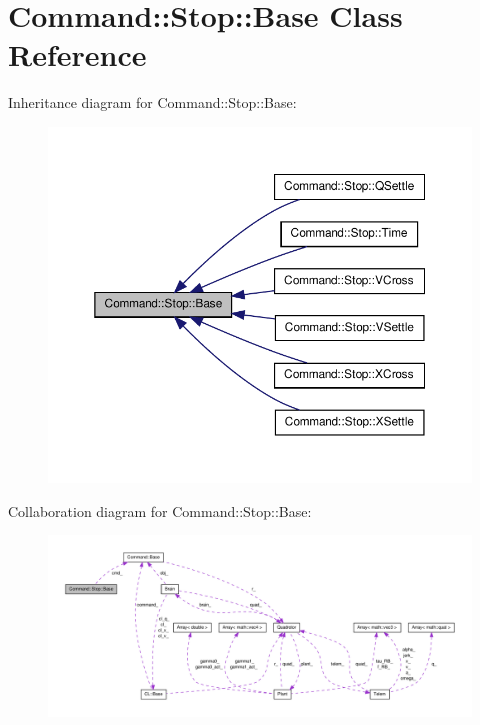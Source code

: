 \hypertarget{classCommand_1_1Stop_1_1Base}{\section{\-Command\-:\-:\-Stop\-:\-:\-Base \-Class \-Reference}
\label{classCommand_1_1Stop_1_1Base}
}


\-Inheritance diagram for \-Command\-:\-:\-Stop\-:\-:\-Base\-:\nopagebreak
\begin{figure}[H]
\begin{center}
\leavevmode
\includegraphics[width=350pt]{classCommand_1_1Stop_1_1Base__inherit__graph}
\end{center}
\end{figure}


\-Collaboration diagram for \-Command\-:\-:\-Stop\-:\-:\-Base\-:\nopagebreak
\begin{figure}[H]
\begin{center}
\leavevmode
\includegraphics[width=350pt]{classCommand_1_1Stop_1_1Base__coll__graph}
\end{center}
\end{figure}
